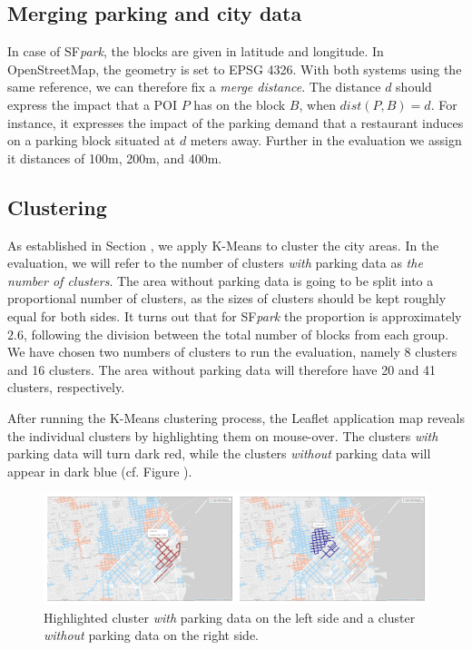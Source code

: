 \subsection{Merging parking and city data}
\label{experimental_setup:merging_parking_city_data}
In case of SF\textit{park}, the blocks are given in latitude and longitude.
In OpenStreetMap, the geometry is set to EPSG 4326.
With both systems using the same reference, we can therefore fix a \textit{merge distance}.
The distance $d$ should express the impact that a POI $P$ has on the block $B$, when $dist(P, B) = d$. For instance, it expresses the impact of the parking demand that a restaurant induces on a parking block situated at $d$ meters away.
Further in the evaluation we assign it distances of 100m, 200m, and 400m.

\subsection{Clustering}
\label{experimental_setup:clustering}
As established in Section , we apply K-Means to cluster the city areas.
In the evaluation, we will refer to the number of clusters \textit{with} parking data as \textit{the number of clusters}.
The area without parking data is going to be split into a proportional number of clusters, as the sizes of clusters should be kept roughly equal for both sides.
It turns out that for SF\textit{park} the proportion is approximately $2.6$, following the division between the total number of blocks from each group.
We have chosen two numbers of clusters to run the evaluation, namely 8 clusters and 16 clusters.
The area without parking data will therefore have 20 and 41 clusters, respectively. 

After running the K-Means clustering process, the Leaflet application map reveals the individual clusters by highlighting them on mouse-over.
The clusters \textit{with} parking data will turn dark red, while the clusters \textit{without} parking data will appear in dark blue (cf. Figure ). 

\begin{figure}[!ht]
	\centering
	\includegraphics[width=\textwidth]{graphics/highlighted_collage.png}
	\caption{Highlighted cluster \textit{with} parking data on the left side and a cluster \textit{without} parking data on the right side.}
	\label{fig:highlighted_collage}
\end{figure}

